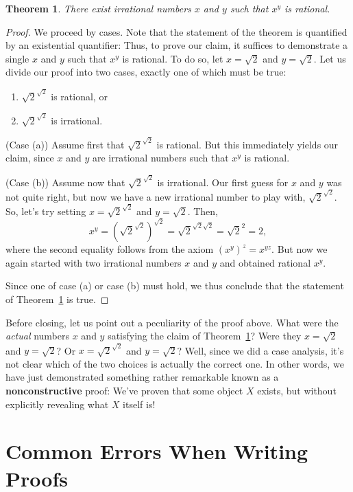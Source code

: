 \documentclass[11pt]{article}
\newcounter{thm}
\newtheorem{theorem}{Theorem}[thm]
\begin{document}
\begin{theorem}\label{thm:xy}
    There exist irrational numbers $x$ and $y$ such that $x^y$ is rational.
\end{theorem}
\begin{proof}
We proceed by cases. Note that the statement of the theorem is quantified by an existential quantifier: Thus, to prove our claim, it suffices to demonstrate a single $x$ and $y$ such that $x^y$ is rational. To do so, let $x=\sqrt{2}$ and $y=\sqrt{2}$. Let us divide our proof into two cases, exactly one of which must be true: \begin{enumerate}
    \item[(a)] $\sqrt{2}^{\sqrt{2}}$ is rational, or
    \item [(b)] $\sqrt{2}^{\sqrt{2}}$ is irrational.
\end{enumerate}
(Case (a)) Assume first that $\sqrt{2}^{\sqrt{2}}$ is rational. But this immediately yields our claim, since $x$ and $y$ are irrational numbers such that $x^y$ is rational.

(Case (b)) Assume now that $\sqrt{2}^{\sqrt{2}}$ is irrational. Our first guess for $x$ and $y$ was not quite right, but now we have a new irrational number to play with, $\sqrt{2}^{\sqrt{2}}$. So, let's try setting $x=\sqrt{2}^{\sqrt{2}}$ and $y=\sqrt{2}$. Then,
$$
   x^y  =  \left(\sqrt{2}^{\sqrt{2}}\right)^{\sqrt{2}}
        =  \sqrt{2}^{\sqrt{2}\sqrt{2}}
        =  \sqrt{2}^2 = 2,
$$
where the second equality follows from the axiom $(x^y)^z=x^{yz}$. But now we again started with two irrational numbers $x$ and $y$ and obtained rational $x^y$.

Since one of case (a) or case (b) must hold, we thus conclude that the statement of Theorem~\ref{thm:xy} is true.
\end{proof}

Before closing, let us point out a peculiarity of the proof above. What were the \emph{actual} numbers $x$ and $y$ satisfying the claim of Theorem~\ref{thm:xy}? Were they $x=\sqrt{2}$ and $y=\sqrt{2}$? Or $x=\sqrt{2}^{\sqrt{2}}$ and $y=\sqrt{2}$? Well, since we did a case analysis, it's not clear which of the two choices is actually the correct one. In other words, we have just demonstrated something rather remarkable known as a \textbf{nonconstructive} proof: We've proven that some object $X$ exists, but without explicitly revealing what $X$ itself is! 

\section{Common Errors When Writing Proofs}\label{scn:errors}
\end{document}
